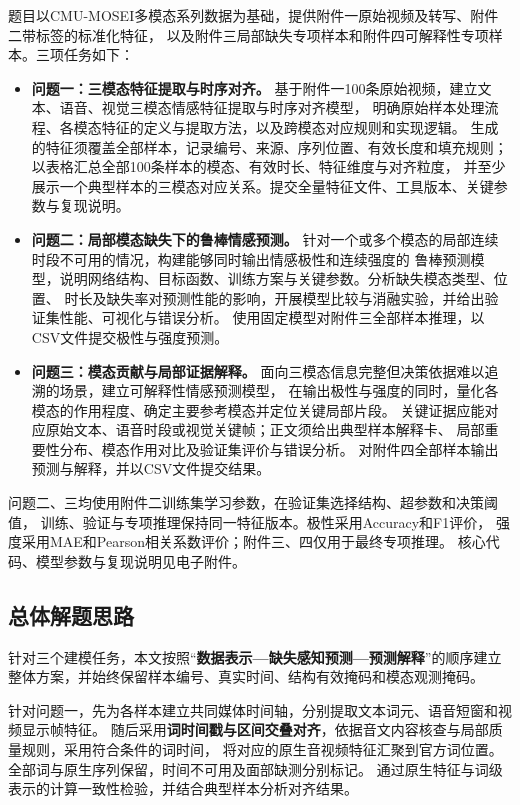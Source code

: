 \documentclass[bwprint]{gmcmthesis}
\begin{document}
题目以CMU-MOSEI多模态系列数据为基础，提供附件一原始视频及转写、附件二带标签的标准化特征，
以及附件三局部缺失专项样本和附件四可解释性专项样本。三项任务如下：
\begin{itemize}
 \item \textbf{问题一：三模态特征提取与时序对齐。}
 基于附件一100条原始视频，建立文本、语音、视觉三模态情感特征提取与时序对齐模型，
 明确原始样本处理流程、各模态特征的定义与提取方法，以及跨模态对应规则和实现逻辑。
 生成的特征须覆盖全部样本，记录编号、来源、序列位置、有效长度和填充规则；
 以表格汇总全部100条样本的模态、有效时长、特征维度与对齐粒度，
 并至少展示一个典型样本的三模态对应关系。提交全量特征文件、工具版本、关键参数与复现说明。

 \item \textbf{问题二：局部模态缺失下的鲁棒情感预测。}
 针对一个或多个模态的局部连续时段不可用的情况，构建能够同时输出情感极性和连续强度的
 鲁棒预测模型，说明网络结构、目标函数、训练方案与关键参数。分析缺失模态类型、位置、
 时长及缺失率对预测性能的影响，开展模型比较与消融实验，并给出验证集性能、可视化与错误分析。
 使用固定模型对附件三全部样本推理，以CSV文件提交极性与强度预测。

 \item \textbf{问题三：模态贡献与局部证据解释。}
 面向三模态信息完整但决策依据难以追溯的场景，建立可解释性情感预测模型，
 在输出极性与强度的同时，量化各模态的作用程度、确定主要参考模态并定位关键局部片段。
 关键证据应能对应原始文本、语音时段或视觉关键帧；正文须给出典型样本解释卡、
 局部重要性分布、模态作用对比及验证集评价与错误分析。
 对附件四全部样本输出预测与解释，并以CSV文件提交结果。
\end{itemize}

问题二、三均使用附件二训练集学习参数，在验证集选择结构、超参数和决策阈值，
训练、验证与专项推理保持同一特征版本。极性采用Accuracy和F1评价，
强度采用MAE和Pearson相关系数评价；附件三、四仅用于最终专项推理。
核心代码、模型参数与复现说明见电子附件。

\subsection{总体解题思路}
\label{sec:analysis}

针对三个建模任务，本文按照“\textbf{数据表示—缺失感知预测—预测解释}”的顺序建立
整体方案，并始终保留样本编号、真实时间、结构有效掩码和模态观测掩码。

针对问题一，先为各样本建立共同媒体时间轴，分别提取文本词元、语音短窗和视频显示帧特征。
随后采用\textbf{词时间戳与区间交叠对齐}，依据音文内容核查与局部质量规则，采用符合条件的词时间，
将对应的原生音视频特征汇聚到官方词位置。全部词与原生序列保留，时间不可用及面部缺测分别标记。
通过原生特征与词级表示的计算一致性检验，并结合典型样本分析对齐结果。
\end{document}
